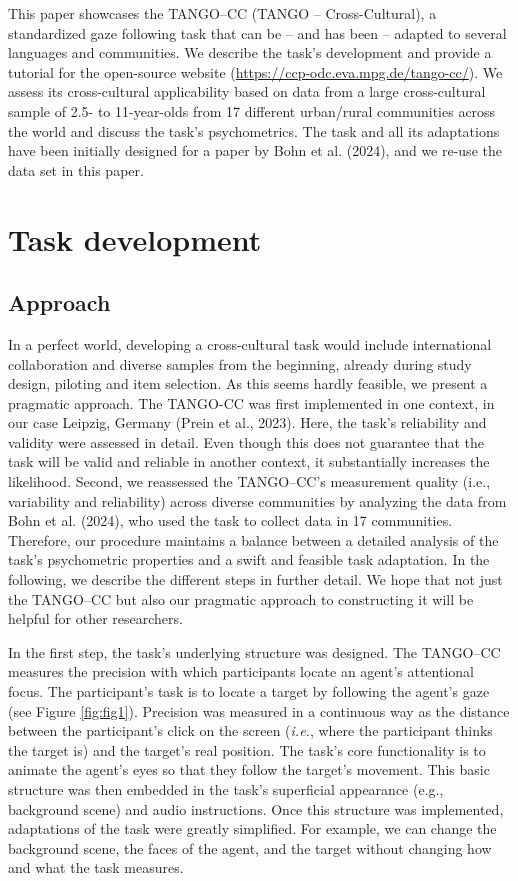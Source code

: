 \documentclass[
  man,floatsintext]{apa7}
\begin{document}
This paper showcases the TANGO--CC (TANGO -- Cross-Cultural), a standardized gaze following task that can be -- and has been -- adapted to several languages and communities.
We describe the task's development and provide a tutorial for the open-source website (\url{https://ccp-odc.eva.mpg.de/tango-cc/}).
We assess its cross-cultural applicability based on data from a large cross-cultural sample of 2.5- to 11-year-olds from 17 different urban/rural communities across the world and discuss the task's psychometrics.
The task and all its adaptations have been initially designed for a paper by Bohn et al. (2024), and we re-use the data set in this paper.

\section{Task development}\label{task-development}

\subsection{Approach}\label{approach}

In a perfect world, developing a cross-cultural task would include international collaboration and diverse samples from the beginning, already during study design, piloting and item selection.
As this seems hardly feasible, we present a pragmatic approach.
The TANGO-CC was first implemented in one context, in our case Leipzig, Germany (Prein et al., 2023).
Here, the task's reliability and validity were assessed in detail.
Even though this does not guarantee that the task will be valid and reliable in another context, it substantially increases the likelihood.
Second, we reassessed the TANGO--CC's measurement quality (i.e., variability and reliability) across diverse communities by analyzing the data from Bohn et al. (2024), who used the task to collect data in 17 communities.
Therefore, our procedure maintains a balance between a detailed analysis of the task's psychometric properties and a swift and feasible task adaptation.
In the following, we describe the different steps in further detail.
We hope that not just the TANGO--CC but also our pragmatic approach to constructing it will be helpful for other researchers.

In the first step, the task's underlying structure was designed.
The TANGO--CC measures the precision with which participants locate an agent's attentional focus.
The participant's task is to locate a target by following the agent's gaze (see Figure \ref{fig:fig1}).
Precision was measured in a continuous way as the distance between the participant's click on the screen (\emph{i.e.}, where the participant thinks the target is) and the target's real position.
The task's core functionality is to animate the agent's eyes so that they follow the target's movement.
This basic structure was then embedded in the task's superficial appearance (e.g., background scene) and audio instructions.
Once this structure was implemented, adaptations of the task were greatly simplified.
For example, we can change the background scene, the faces of the agent, and the target without changing how and what the task measures.
\end{document}
